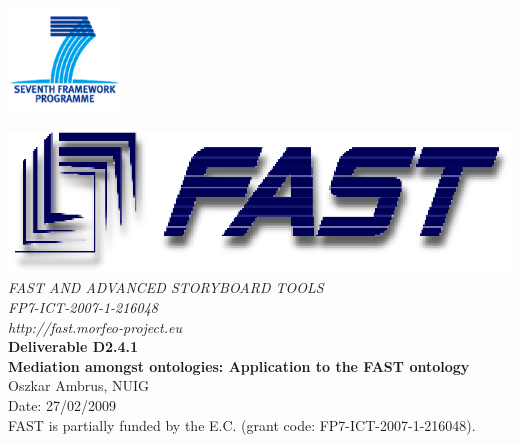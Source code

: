 \documentclass{fast_latex}
\newcommand\deliverableNumber{D2.4.1}
\newcommand\deliverableTitle{Mediation amongst ontologies: Application to the FAST ontology}
\newcommand\authorOne{Oszkar Ambrus, NUIG}
\begin{document}

\def\note#1{\marginpar{\footnotesize#1}} %



\thispagestyle{empty}


\begin{flushright}
	\includegraphics[width=3cm]{images/FP7_logo.png}
\end{flushright}

\vspace{1cm}

	\begin{center}
		\includegraphics{images/FAST_logo}\\
		\vspace{1cm}
		{\LARGE{\sffamily \emph{FAST AND ADVANCED STORYBOARD TOOLS}}}\\
		\vspace{0.5cm}
		{\LARGE \sffamily \emph{FP7-ICT-2007-1-216048}}\\
		\vspace{0.5cm}
		{\LARGE \sffamily \emph{http://fast.morfeo-project.eu}}\\
		\vspace{4cm}
		{\LARGE \sffamily \textbf{Deliverable \deliverableNumber}}\\
		\vspace{0.5cm}
		{\LARGE \sffamily \textbf{\deliverableTitle}}\\
		\vspace{2cm}
		{\large \sffamily \authorOne}\\
		\vspace{0.5cm}
		\vfill
		{\large \sffamily Date: 27/02/2009}\\
		\vspace{1cm}
		{\sffamily FAST is partially funded by the E.C. (grant code: FP7-ICT-2007-1-216048).}
		
	\end{center}
\end{document}
